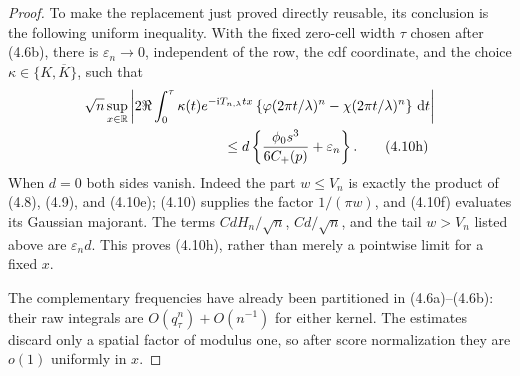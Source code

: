 \documentclass[11pt,a4paper]{article}
\numberwithin{equation}{section}
\theoremstyle{definition}
\theoremstyle{remark}
\newcommand{\ii}{\mathrm i}
\newcommand{\dd}{\,\mathrm d}
\begin{document}
\begin{proof}
To make the replacement just proved directly reusable, its conclusion is
the following uniform inequality.  With the fixed zero-cell width $\tau$
chosen after (4.6b), there is $\varepsilon_n\to0$, independent of the row,
the cdf coordinate, and the choice $\kappa\in\{K,\overline K\}$, such that
\begin{align}
&\sqrt n\sup_{x\in\mathbb R}\left|
 2\Re\int_0^\tau\kappa(t)e^{-\ii T_{n,\lambda}tx}
 \left\{\varphi(2\pi t/\lambda)^n-
              \chi(2\pi t/\lambda)^n\right\}\dd t\right| \notag\\
&\hspace{35mm}\le
 d\left\{{\phi_0s^3\over6C_+(p)}+\varepsilon_n\right\}.          \tag{4.10h}
\end{align}
When $d=0$ both sides vanish.  Indeed the part $w\le V_n$ is exactly
the product of (4.8), (4.9), and (4.10e); (4.10) supplies the factor
$1/(\pi w)$, and (4.10f) evaluates its Gaussian majorant.  The terms
$CdH_n/\sqrt n$, $Cd/\sqrt n$, and the tail $w>V_n$ listed above are
$\varepsilon_nd$.  This proves (4.10h), rather than merely a pointwise
limit for a fixed $x$.

The complementary frequencies have already been partitioned in
(4.6a)--(4.6b): their raw integrals are $O(q_\tau^n)+O(n^{-1})$ for either
kernel.  The estimates discard only a spatial factor of modulus one, so
after score normalization they are $o(1)$ uniformly in $x$.


\end{proof}
\end{document}

